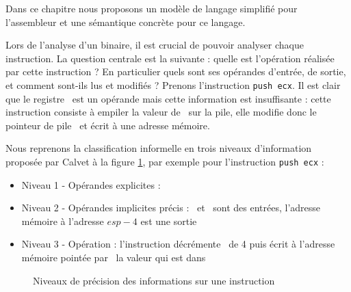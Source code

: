 
Dans ce chapitre nous proposons un modèle de langage simplifié pour l'assembleur et une sémantique concrète pour ce langage.

Lors de l'analyse d'un binaire, il est crucial de pouvoir analyser chaque instruction.
La question centrale est la suivante : quelle est l'opération réalisée par cette instruction ?
En particulier quels sont ses opérandes d'entrée, de sortie, et comment sont-ils lus et modifiés ?
Prenons l'instruction \texttt{push ecx}. 
Il est clair que le registre \ecx\ est un opérande mais cette information est insuffisante : cette instruction consiste à empiler la valeur de \ecx\ sur la pile, elle modifie donc le pointeur de pile \esp\ et écrit à une adresse mémoire.

Nous reprenons la classification informelle en trois niveaux d'information proposée par Calvet \cite{Calvet2013} à la figure \ref{fig:niveaux_sem}, par exemple pour l'instruction \texttt{push ecx} :
\begin{itemize}
 \item Niveau 1 - Opérandes explicites : \ecx
 \item Niveau 2 - Opérandes implicites précis : \ecx\ et \esp\ sont des entrées, l'adresse mémoire à l'adresse $esp-4$ est une sortie
 \item Niveau 3 - Opération : l'instruction décrémente \esp\ de 4 puis écrit à l'adresse mémoire pointée par \esp\ la valeur qui est dans \ecx
\end{itemize}

\begin{figure}
\begin{center}
\end{center}
\caption{Niveaux de précision des informations sur une instruction}
\label{fig:niveaux_sem}
\end{figure}

